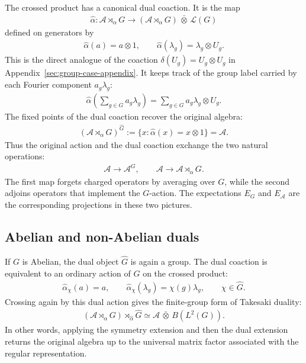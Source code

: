 \documentclass[11pt]{article}
\newcommand{\mA}{\mathcal{A}}
\begin{document}
The crossed product has a canonical dual coaction. It is the map
\begin{align}
    \widehat\alpha:\mA\rtimes_\alpha G
    \to (\mA\rtimes_\alpha G)\,\bar\otimes\,\mathcal L(G)
\end{align}
defined on generators by
\begin{align}
    \widehat\alpha(a)=a\otimes 1,\qquad
    \widehat\alpha(\lambda_g)=\lambda_g\otimes U_g.
\end{align}
This is the direct analogue of the coaction
$\delta(U_g)=U_g\otimes U_g$ in Appendix~\ref{sec:group-case-appendix}. It keeps
track of the group label carried by each Fourier component $a_g\lambda_g$:
\begin{align}
    \widehat\alpha\left(\sum_{g\in G}a_g\lambda_g\right)
    =\sum_{g\in G}a_g\lambda_g\otimes U_g.
\end{align}
The fixed points of the dual coaction recover the original algebra:
\begin{align}
    (\mA\rtimes_\alpha G)^{\widehat G}
    :=\{x:\widehat\alpha(x)=x\otimes 1\}
    =\mA.
\end{align}
Thus the original action and the dual coaction exchange the two natural
operations:
\begin{align}
    \mA \longrightarrow \mA^G,
    \qquad
    \mA \longrightarrow \mA\rtimes_\alpha G.
\end{align}
The first map forgets charged operators by averaging over $G$, while the second
adjoins operators that implement the $G$-action. The expectations $E_G$ and
$E_{\mA}$ are the corresponding projections in these two pictures.

\subsection{Abelian and non-Abelian duals}

If $G$ is Abelian, the dual object $\hat G$ is again a group. The dual coaction
is equivalent to an ordinary action of $\hat G$ on the crossed product:
\begin{align}
    \widehat\alpha_\chi(a)=a,\qquad
    \widehat\alpha_\chi(\lambda_g)=\chi(g)\lambda_g,
    \qquad \chi\in\hat G.
\end{align}
Crossing again by this dual action gives the finite-group form of Takesaki
duality:
\begin{align}
    (\mA\rtimes_\alpha G)\rtimes_{\widehat\alpha}\hat G
    \simeq \mA\,\bar\otimes\,B(L^2(G)).
\end{align}
In other words, applying the symmetry extension and then the dual extension
returns the original algebra up to the universal matrix factor associated with
the regular representation.
\end{document}

